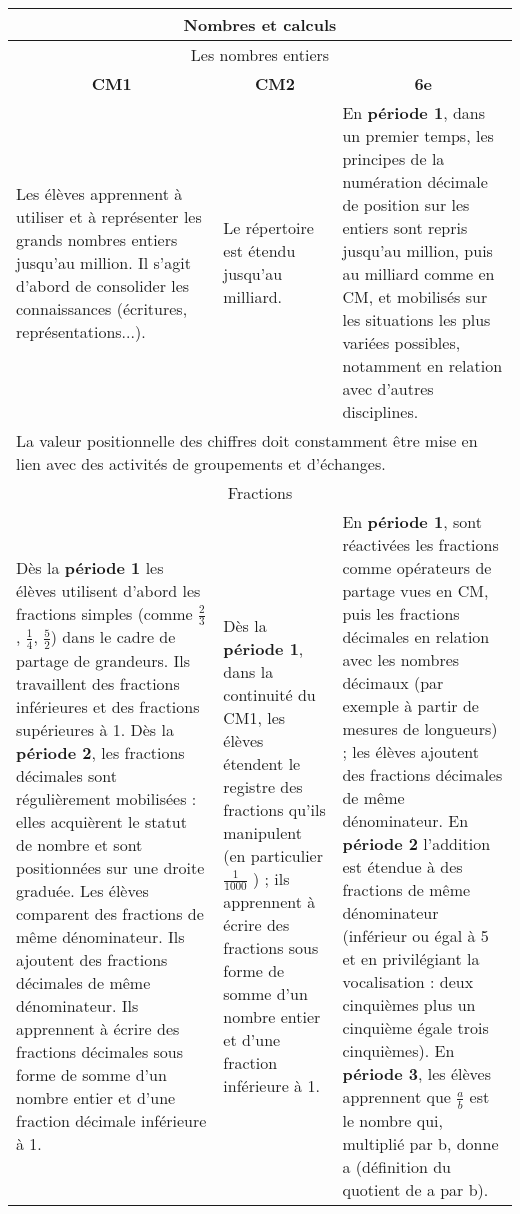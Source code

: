 \documentclass[11pt]{article}
\newcommand{\titre}{\sffamily{\huge\color{or}\centerline{REPÈRES ANNUELS DE PROGRESSION POUR LE CYCLE 3}}\rmfamily}
\newcommand{\categorie}[1]{\hline\multicolumn{3}{|c|}{\color{white}\Large\cellcolor{or}\sffamily\phantom{É} #1 \phantom{É}}\rmfamily \\\hline}
\newcommand{\souscategorie}[1]{\hline\multicolumn{3}{|c|}{\color{or}\sffamily\phantom{É}#1\phantom{É}\rmfamily}\\\hline}
\newcommand{\note}[1]{\hline\multicolumn{3}{|p{18.6cm}|}{#1} \\ \hline}
\newcommand{\cmun}{\multicolumn{1}{|c|}{\textbf{CM1}}}
\newcommand{\cmdeux}{\multicolumn{1}{|c|}{\textbf{CM2}}}
\newcommand{\sixieme}{\multicolumn{1}{|c|}{\textbf{6e}}}
\newenvironment{programme}
{
    \setlength{\arrayrulewidth}{0.5pt}
    \arrayrulecolor{or}
    \begin{center}
    \begin{tabular}{|p{6.4cm}|p{6.4cm}|p{6.4cm}|}
}
{
    \hline
    \end{tabular}
    \end{center}
}
\begin{document}
\rmfamily

\titre

\begin{programme}
    \categorie{Nombres et calculs}
    \souscategorie{Les nombres entiers}
    \cmun & \cmdeux & \sixieme \\ \hline
    Les élèves apprennent à utiliser et à représenter les grands nombres entiers jusqu’au million. Il s'agit d'abord de consolider les connaissances (écritures, représentations...). & Le répertoire est étendu jusqu’au milliard. & En \textbf{période 1}, dans un premier temps, les principes de la numération décimale de position sur les entiers sont repris jusqu’au million, puis au milliard comme en CM, et mobilisés sur les situations les plus variées possibles, notamment en relation avec d’autres disciplines. \\
    \note{La valeur positionnelle des chiffres doit constamment être mise en lien avec des activités de groupements et d’échanges.} 
    \souscategorie{Fractions} 
    Dès la \textbf{période 1} les élèves utilisent d’abord les fractions simples (comme $\frac{2}{3}$, $\frac{1}{4}$, $\frac{5}{2}$) dans le cadre de partage de grandeurs. Ils travaillent des fractions inférieures et des fractions supérieures à 1. Dès la \textbf{période 2}, les fractions décimales sont régulièrement mobilisées : elles acquièrent le statut de nombre et sont positionnées sur une droite graduée. Les élèves comparent des fractions de même dénominateur. Ils ajoutent des fractions décimales de même dénominateur. Ils apprennent à écrire des fractions décimales sous forme de somme d’un nombre entier et d’une fraction décimale inférieure à 1. & Dès la \textbf{période 1}, dans la continuité du CM1, les élèves étendent le registre des fractions qu’ils manipulent (en particulier $\frac{1}{1000}$ ) ; ils apprennent à écrire des fractions sous forme de somme d’un nombre entier et d’une fraction inférieure à 1. & En \textbf{période 1}, sont réactivées les fractions comme opérateurs de partage vues en CM, puis les fractions décimales en relation avec les nombres décimaux (par exemple à partir de mesures de longueurs) ; les élèves ajoutent des fractions décimales de même dénominateur. En \textbf{période 2} l’addition est étendue à des fractions de même dénominateur (inférieur ou égal à 5 et en privilégiant la vocalisation : deux cinquièmes plus un cinquième égale trois cinquièmes). En \textbf{période 3}, les élèves apprennent que $\frac{a}{b}$ est le nombre qui, multiplié par b, donne a (définition du quotient de a par b). \\

\end{programme}
\end{document}
